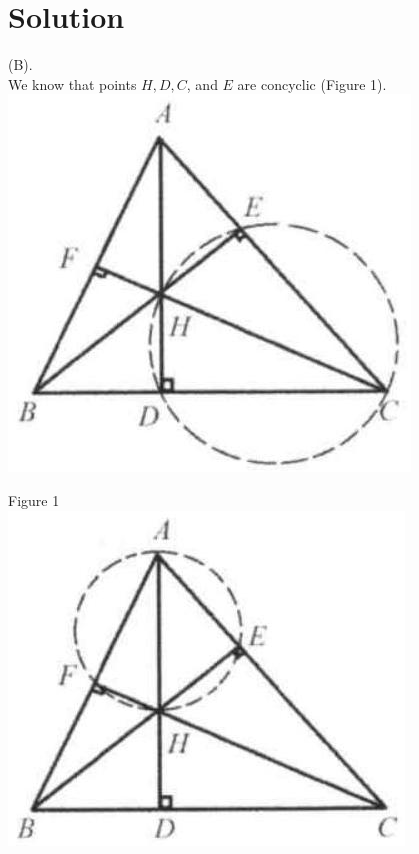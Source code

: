 \documentclass{article}
\begin{document}
\section*{Solution}
(B).\\
We know that points \(H, D, C\), and \(E\) are concyclic (Figure 1).\\
\centering
\includegraphics[width=\textwidth]{images/210(4).jpg}

Figure 1\\
\centering
\includegraphics[width=\textwidth]{images/210(3).jpg}
\end{document}
